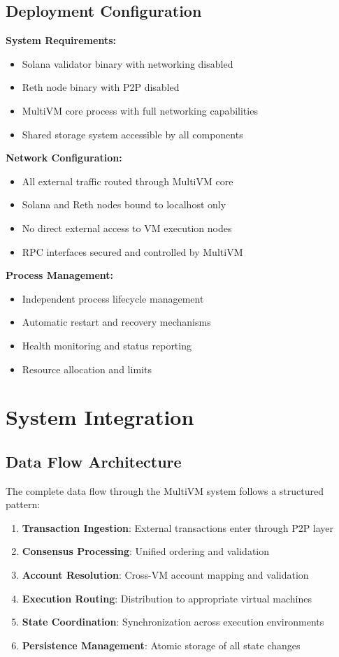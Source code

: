 \documentclass[11pt,a4paper]{article}
\begin{document}
\subsection{Deployment Configuration}

\textbf{System Requirements:}
\begin{itemize}
    \item Solana validator binary with networking disabled
    \item Reth node binary with P2P disabled
    \item MultiVM core process with full networking capabilities
    \item Shared storage system accessible by all components
\end{itemize}

\textbf{Network Configuration:}
\begin{itemize}
    \item All external traffic routed through MultiVM core
    \item Solana and Reth nodes bound to localhost only
    \item No direct external access to VM execution nodes
    \item RPC interfaces secured and controlled by MultiVM
\end{itemize}

\textbf{Process Management:}
\begin{itemize}
    \item Independent process lifecycle management
    \item Automatic restart and recovery mechanisms
    \item Health monitoring and status reporting
    \item Resource allocation and limits
\end{itemize}

\section{System Integration}

\subsection{Data Flow Architecture}
The complete data flow through the MultiVM system follows a structured pattern:

\begin{enumerate}
    \item \textbf{Transaction Ingestion}: External transactions enter through P2P layer
    \item \textbf{Consensus Processing}: Unified ordering and validation
    \item \textbf{Account Resolution}: Cross-VM account mapping and validation
    \item \textbf{Execution Routing}: Distribution to appropriate virtual machines
    \item \textbf{State Coordination}: Synchronization across execution environments
    \item \textbf{Persistence Management}: Atomic storage of all state changes
\end{enumerate}
\end{document}
